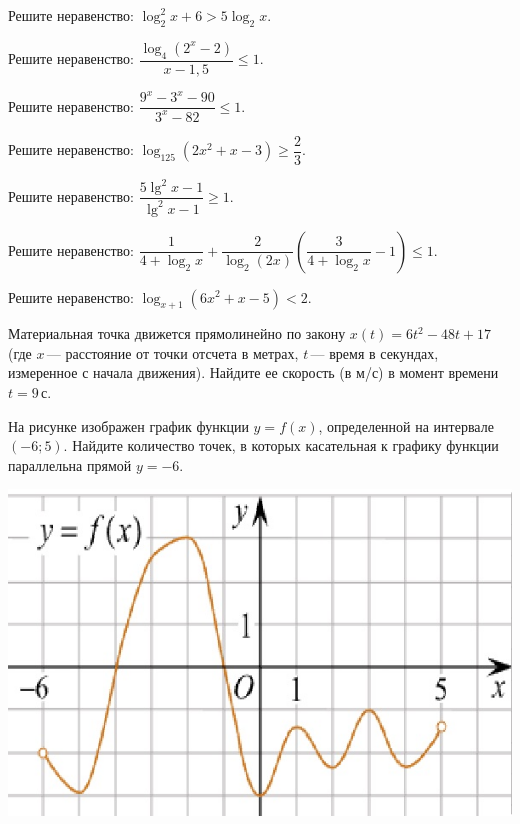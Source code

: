 \begin{homework}[number=2]
\begin{listofex}
		\item Решите неравенство: \( \log^2_2 x + 6 > 5\log_2 x \).
		\item Решите неравенство: \( \dfrac{ \log_4(2^x-2)}{ x-1,5 } \le 1 \).
		\item Решите неравенство: \( \dfrac{ 9^x-3^x-90 }{3^x-82  } \le 1 \).
		\item Решите неравенство: \(\log_{125}(2x^2+x-3) \ge \dfrac{ 2 }{ 3 }\).
		\item Решите неравенство: \( \dfrac{ 5\lg^2x-1 }{ \lg^2x -1}\ge1 \).
		\item Решите неравенство: \( \dfrac{ 1 }{ 4+\log_2x }+\dfrac{ 2 }{ \log_2(2x) }\left( \dfrac{ 3 }{ 4+\log_2x }-1 \right) \le 1 \).
		\item Решите неравенство: \( \log_{x+1}(6x^2+x-5)<2 \).
		\item Материальная точка движется прямолинейно по закону \( x(t)=6t^2-48t+17 \) (где \(x\) --- расстояние от точки отсчета в метрах, \(t\) --- время в секундах, измеренное с начала движения). Найдите ее скорость (в м/с) в момент времени \(t  =  9\) с.
		\item
		\begin{minipage}[t]{\bodywidth}
			На рисунке изображен график функции \(y = f(x)\), определенной на интервале \((-6; 5)\). Найдите количество точек, в которых касательная к графику функции параллельна прямой \(y=-6\).
		\end{minipage}
		\hspace{0.02\linewidth}
		\begin{minipage}[t]{\picwidth}
			\includegraphics[align=t, width=\linewidth]{../pics/G111M3H2-4}
		\end{minipage}
	\end{listofex}
\end{homework}

